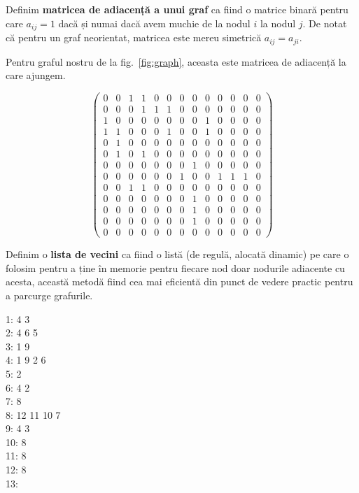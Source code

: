 \begin{definition}
    Definim \textbf{matricea de adiacență a unui graf} ca fiind o matrice binară pentru care $a_{ij} = 1$ dacă și numai dacă avem muchie de la nodul $i$ la nodul $j$. De notat că pentru un graf neorientat, matricea este mereu simetrică $a_{ij} = a_{ji}$.
\end{definition}

Pentru graful nostru de la fig.~\ref{fig:graph}, aceasta este matricea de adiacență la care ajungem.

\begin{equation*}
    \begin{pmatrix}
    0 & 0 & 1 & 1 & 0 & 0 & 0 & 0 & 0 & 0 & 0 & 0 & 0\\
    0 & 0 & 0 & 1 & 1 & 1 & 0 & 0 & 0 & 0 & 0 & 0 & 0\\
    1 & 0 & 0 & 0 & 0 & 0 & 0 & 0 & 1 & 0 & 0 & 0 & 0\\
    1 & 1 & 0 & 0 & 0 & 1 & 0 & 0 & 1 & 0 & 0 & 0 & 0\\
    0 & 1 & 0 & 0 & 0 & 0 & 0 & 0 & 0 & 0 & 0 & 0 & 0\\
    0 & 1 & 0 & 1 & 0 & 0 & 0 & 0 & 0 & 0 & 0 & 0 & 0\\
    0 & 0 & 0 & 0 & 0 & 0 & 0 & 1 & 0 & 0 & 0 & 0 & 0\\
    0 & 0 & 0 & 0 & 0 & 0 & 1 & 0 & 0 & 1 & 1 & 1 & 0\\
    0 & 0 & 1 & 1 & 0 & 0 & 0 & 0 & 0 & 0 & 0 & 0 & 0\\
    0 & 0 & 0 & 0 & 0 & 0 & 0 & 1 & 0 & 0 & 0 & 0 & 0\\
    0 & 0 & 0 & 0 & 0 & 0 & 0 & 1 & 0 & 0 & 0 & 0 & 0\\
    0 & 0 & 0 & 0 & 0 & 0 & 0 & 1 & 0 & 0 & 0 & 0 & 0\\
    0 & 0 & 0 & 0 & 0 & 0 & 0 & 0 & 0 & 0 & 0 & 0 & 0
    \end{pmatrix}
\end{equation*}

\begin{definition}
    Definim o \textbf{lista de vecini} ca fiind o listă (de regulă, alocată dinamic) pe care o folosim pentru a ține în memorie pentru fiecare nod doar nodurile adiacente cu acesta, această metodă fiind cea mai eficientă din punct de vedere practic pentru a parcurge grafurile.
\end{definition}

\begin{raggedright}
1: 4 3\\
2: 4 6 5\\
3: 1 9\\
4: 1 9 2 6\\
5: 2\\
6: 4 2\\
7: 8\\
8: 12 11 10 7\\
9: 4 3\\
10: 8\\
11: 8\\
12: 8\\
13:
\end{raggedright}

